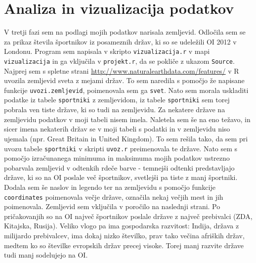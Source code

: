 \documentclass[11pt,a4paper]{article}
\begin{document}
\section{Analiza in vizualizacija podatkov}
V tretji fazi sem na podlagi mojih podatkov narisala zemljevid. Odločila sem se za prikaz števila športnikov iz posameznih držav, ki so se udeležili OI 2012 v Londonu.
\newline
Program sem napisala v skripto \verb|vizualizacija.r| v mapi \verb|vizualizacija| in ga vključila v \verb|projekt.r|, da se pokliče z ukazom \verb|Source|.
\newline
Najprej sem s spletne strani \url{http://www.naturalearthdata.com/features/} v R uvozila zemljevid sveta z mejami držav. To sem naredila s pomočjo že napisane funkcije \verb|uvozi.zemljevid|, poimenovala sem ga \verb|svet|. Nato sem morala uskladiti 
podatke iz tabele \verb|sportniki| z zemljevidom, iz tabele \verb|sportniki| sem torej pobrala ven tiste države, ki so tudi na zemljevidu. Za nekatere države na zemljevidu podatkov v moji tabeli nisem imela. Naletela sem še na eno težavo, in sicer imena nekaterih držav se v moji tabeli s podatki in v zemljevidu niso ujemala (npr. Great Britain in United Kingdom). To sem rešila tako, da sem pri uvozu tabele \verb|sportniki| v skripti \verb|uvoz.r| preimenovala te države.
\newline
Nato sem s pomočjo izračunanega minimuma in maksimuma mojih podatkov ustrezno pobarvala zemljevid v odtenkih rdeče barve - temnejši odtenki predstavljajo države, ki so na OI poslale več športnikov, svetlejši pa tiste z manj športniki.
Dodala sem še naslov in legendo ter na zemljevidu s pomočjo funkcije \verb|coordinates| poimenovala večje države, označila nekaj večjih mest in jih poimenovala.
\newline
Zemljevid sem vključila v poročilo na naslednji strani. Po pričakovanjih so na OI največ športnikov poslale države z največ prebivalci (ZDA, Kitajska, Rusija). Veliko vlogo pa ima gospodarska razvitost: Indija, država z milijardo prebivalcev, ima dokaj nizko številko, prav tako večina afriških držav, medtem ko so številke evropskih držav precej visoke. Torej manj razvite države tudi manj sodelujejo na OI.


\newpage
\end{document}
